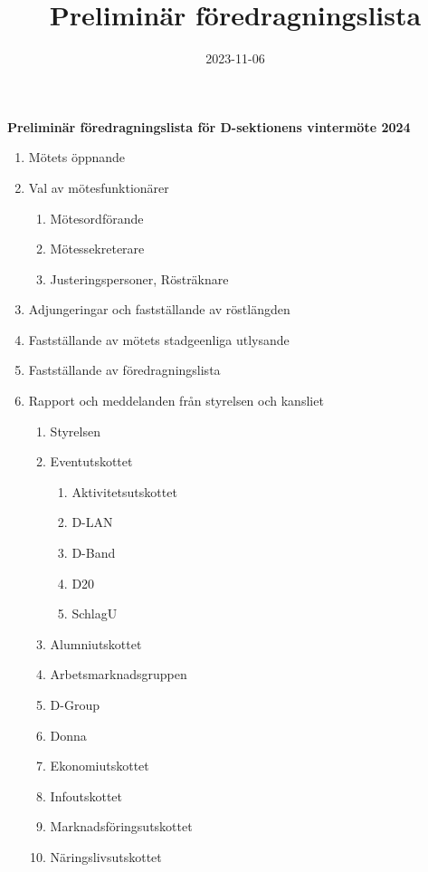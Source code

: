 \documentclass{datateknologsektionen-document}
\title{Preliminär föredragningslista}
\date{2023-11-06}
\begin{document}
\large
\begin{center}
  {\LARGE\bfseries Preliminär föredragningslista för D-sektionens vintermöte 2024}
  \vspace{2mm}
\end{center}

\Large
\begin{enumerate}[topsep=0pt,itemsep=1ex]
  \item Mötets öppnande
  \item Val av mötesfunktionärer
        \begin{enumerate}[label*=\arabic*.,leftmargin=3em]
          \item Mötesordförande
          \item Mötessekreterare
          \item Justeringspersoner, Rösträknare
        \end{enumerate}
  \item Adjungeringar och fastställande av röstlängden
  \item Fastställande av mötets stadgeenliga utlysande
  \item Fastställande av föredragningslista
  \item Rapport och meddelanden från styrelsen och kansliet
        \begin{enumerate}[label*=\arabic*.,leftmargin=3em]
          \item Styrelsen
          \item Eventutskottet
            \begin{enumerate}[label*=\arabic*.,leftmargin=2em]
                \item Aktivitetsutskottet
                \item D-LAN
                \item D-Band
                \item D20
                \item SchlagU
            \end{enumerate}
          \item Alumniutskottet
          \item Arbetsmarknadsgruppen
          \item D-Group
          \item Donna
          \item Ekonomiutskottet
          \item Infoutskottet
          \item Marknadsföringsutskottet
          \item Näringslivsutskottet

\end{enumerate}
\end{enumerate}
\end{document}
